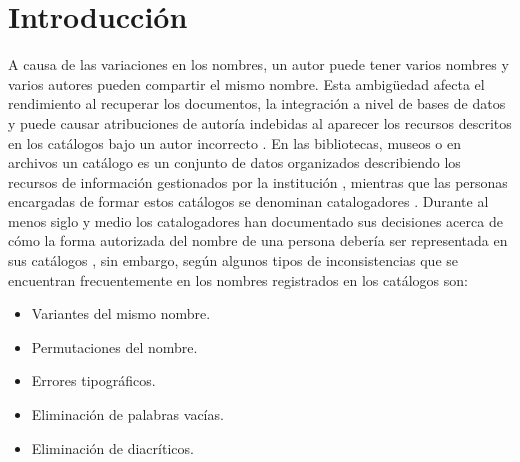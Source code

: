 %
\chapter*{\large Introducción}

\pagestyle{fancy}
\renewcommand{\sectionmark}[1]{\markright{#1}}

\lhead{}
\chead{}
\lfoot{}
\cfoot{}
\rfoot{\thepage}
\renewcommand{\headrulewidth}{0.4pt}

 \def\bibname{\large Introducción}

\pagestyle{fancy}
\lhead{}
\chead{}
\lfoot{}
\cfoot{}
\rfoot{\thepage}
\renewcommand{\headrulewidth}{0.4pt}
\vspace{-1cm}

A causa de las variaciones en los nombres, un autor puede tener varios nombres y varios autores pueden compartir el mismo nombre. Esta ambigüedad afecta el rendimiento al recuperar los documentos, la integración a nivel de bases de datos y puede causar atribuciones de autoría indebidas al aparecer los recursos descritos en los catálogos bajo un autor incorrecto \citep{Han2005}. En las bibliotecas, museos o en archivos un catálogo es un conjunto de datos organizados describiendo los recursos de información gestionados por la institución \citep{InternationalFederationofLibraryAssociationsandInstitutions2009}, mientras que las personas encargadas de formar estos catálogos se denominan catalogadores \citep{RealAcademiaEspanola2014}. Durante al menos siglo y medio los catalogadores han documentado sus decisiones acerca de cómo la forma autorizada del nombre de una persona debería ser representada en sus catálogos \citep{Tillett2009}, sin embargo, según \cite{Carrasco2016} algunos tipos de inconsistencias que se encuentran frecuentemente en los nombres registrados en los catálogos son:

\begin{itemize}
\item Variantes del mismo nombre.
\item Permutaciones del nombre.
\item Errores tipográficos.
\item Eliminación de palabras vacías.
\item Eliminación de diacríticos.
\end{itemize}

